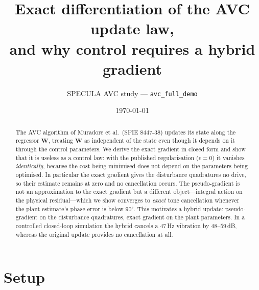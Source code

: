 \documentclass[11pt]{article}
\title{Exact differentiation of the AVC update law,\\
and why control requires a hybrid gradient}
\author{SPECULA AVC study --- \texttt{avc\_full\_demo}}
\date{\today}
\newcommand{\SI}[2]{#1\,#2}
\newcommand{\vW}{\mathbf{W}}
\begin{document}
\maketitle

\begin{abstract}
The AVC algorithm of Muradore et al.\ (SPIE 8447-38) updates its state
along the regressor $\vW$, treating $\vW$ as independent of the state even
though it depends on it through the control parameters. We derive the exact
gradient in closed form and show that it is useless as a control law: with
the published regularisation ($\epsilon=0$) it vanishes \emph{identically},
because the cost being minimised does not depend on the parameters being
optimised. In particular the exact gradient gives the disturbance
quadratures no drive, so their estimate remains at zero and no cancellation
occurs. The pseudo-gradient is not an approximation to the exact gradient
but a different object---integral action on the physical residual---which
we show converges to \emph{exact} tone cancellation whenever the plant
estimate's phase error is below $90^\circ$. This motivates a hybrid update:
pseudo-gradient on the disturbance quadratures, exact gradient on the plant
parameters. In a controlled closed-loop simulation the hybrid cancels a
\SI{47}{Hz} vibration by $48$--$59$\,dB, whereas the original update
provides no cancellation at all.
\end{abstract}

\section{Setup}
\end{document}
